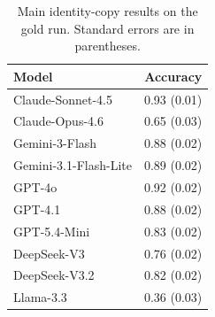 \begin{table}[t]
\centering
\small
\renewcommand{\arraystretch}{1.08}
\begin{tabular}{lr}
\toprule
Model & Accuracy \\
\midrule
Claude-Sonnet-4.5 & 0.93 (0.01) \\
Claude-Opus-4.6 & 0.65 (0.03) \\
Gemini-3-Flash & 0.88 (0.02) \\
Gemini-3.1-Flash-Lite & 0.89 (0.02) \\
GPT-4o & 0.92 (0.02) \\
GPT-4.1 & 0.88 (0.02) \\
GPT-5.4-Mini & 0.83 (0.02) \\
DeepSeek-V3 & 0.76 (0.02) \\
DeepSeek-V3.2 & 0.82 (0.02) \\
Llama-3.3 & 0.36 (0.03) \\
\bottomrule
\end{tabular}
\caption{Main identity-copy results on the gold run. Standard errors are in parentheses.}
\label{tab:identity_main_results}
\end{table}
